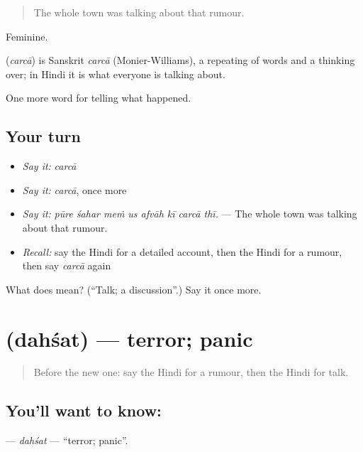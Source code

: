 \begin{quote}
The whole town was talking about that rumour.
\end{quote}

Feminine.

\begin{cousinweb}
\textbf{} (\emph{carcā}) is Sanskrit \emph{carcā} (Monier-Williams), a repeating of words and a thinking over; in Hindi it is what everyone is talking about.
\end{cousinweb}

\begin{grammarlens}[title={What you've built}]
One more word for telling what happened.
\end{grammarlens}

\subsection*{Your turn}
\begin{itemize}
\raggedright
  \item \emph{Say it:} \emph{carcā}
  \item \emph{Say it:} \emph{carcā}, once more
  \item \emph{Say it:} \emph{pūre śahar meṁ us afvāh kī carcā thī.} — The whole town was talking about that rumour.
  \item \emph{Recall:} say the Hindi for a detailed account, then the Hindi for a rumour, then say \emph{carcā} again
\end{itemize}

\begin{tcolorbox}[breakable,colback=teal!4,colframe=teal!35!black,title={Before you move on}]
What does  mean? (\textquotedblleft{}Talk; a discussion\textquotedblright{}.) Say it once more.
\end{tcolorbox}
\section[\texorpdfstring{\hi{दहशत} (dahśat)}{दहशत (dahśat)}]{ (dahśat) — terror; panic}

\label{lesson:HI-C314-dahsat}



\begin{quote}
Before the new one: say the Hindi for a rumour, then the Hindi for talk.
\end{quote}

\subsection*{You'll want to know: }
\textbf{} — \emph{dahśat} — \textquotedblleft{}terror; panic\textquotedblright{}.


